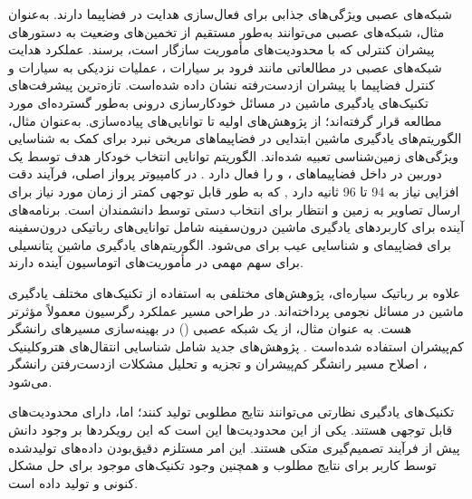 


شبکه‌های عصبی ویژگی‌های جذابی برای فعال‌سازی هدایت در فضاپیما دارند. به‌عنوان مثال، شبکه‌های عصبی می‌توانند به‌طور مستقیم از تخمین‌های وضعیت به دستورهای پیشران کنترلی که با محدودیت‌های مأموریت سازگار است، برسند. عملکرد هدایت شبکه‌های عصبی در مطالعاتی مانند فرود بر سیارات \cite{gaudet2020six}، عملیات نزدیکی به سیارات \cite{gaudet2020terminal} و کنترل فضاپیما با پیشران ازدست‌رفته \cite{rubinsztejn2020neural} نشان داده شده‌است.
تازه‌ترین پیشرفت‌های تکنیک‌های یادگیری ماشین در مسائل خودکارسازی درونی به‌طور گسترده‌ای مورد مطالعه قرار گرفته‌اند؛ از پژوهش‌های اولیه تا توانایی‌های پیاده‌سازی.
به‌عنوان مثال، الگوریتم‌های یادگیری ماشین ابتدایی در فضاپیماهای مریخی نبرد برای کمک به شناسایی ویژگی‌های زمین‌شناسی تعبیه شده‌اند. الگوریتم  توانایی انتخاب خودکار هدف توسط یک دوربین در داخل فضاپیماهای ،  و  را فعال دارد
\cite{estlin2012aegis}.
در کامپیوتر پرواز اصلی، فرآیند دقت افزایی  نیاز به 94 تا 96 ثانیه دارد 
\cite{francis2017aegis},
که به طور قابل توجهی کمتر از زمان مورد نیاز برای ارسال تصاویر به زمین و انتظار برای انتخاب دستی توسط دانشمندان است.
برنامه‌های آینده برای کاربردهای یادگیری ماشین درون‌سفینه شامل توانایی‌های رباتیکی درون‌سفینه برای فضاپیمای 
\cite{higa2019vision, rothrock2016spoc}
و شناسایی عیب برای 
\cite{wagstaff2019enabling} می‌شود. الگوریتم‌های یادگیری ماشین پتانسیلی برای سهم مهمی در مأموریت‌های اتوماسیون آینده دارند.


علاوه بر رباتیک سیاره‌ای، پژوهش‌های مختلفی به استفاده از تکنیک‌های مختلف یادگیری ماشین در مسائل نجومی پرداخته‌اند. در طراحی مسیر عملکرد رگرسیون معمولاً مؤثرتر هست. به عنوان مثال، از یک شبکه عصبی () در بهینه‌سازی مسیرهای رانشگر کم‌پیشران استفاده شده‌است 
\cite{dachwald2004evolutionary}.
پژوهش‌های جدید شامل شناسایی انتقال‌های هتروکلینیک \cite{desmet2019identifying}، اصلاح مسیر رانشگر کم‌پیشران \cite{parrish2018lowthrust} و تجزیه و تحلیل مشکلات ازدست‌رفتن رانشگر \cite{rubinsztejn2020neural} می‌شود.

تکنیک‌های یادگیری نظارتی می‌توانند نتایج مطلوبی تولید کنند؛ اما، دارای محدودیت‌های قابل توجهی هستند. یکی از این محدودیت‌ها این است که این رویکردها بر وجود دانش پیش از فرآیند تصمیم‌گیری متکی هستند. این امر مستلزم دقیق‌بودن داده‌های تولید‌شده توسط کاربر برای نتایج مطلوب و همچنین وجود تکنیک‌های موجود برای حل مشکل کنونی و تولید داده است.

